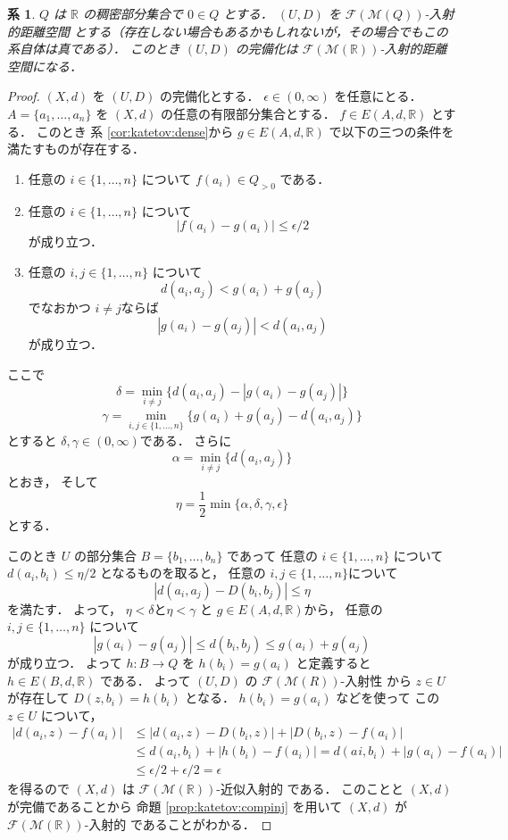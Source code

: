 \documentclass[leqno, 12pt]{jsarticle}
\newtheorem{cor}[thm]{系}
\newcommand{\rr}{\mathbb{R}}
\begin{document}
\begin{cor}\label{cor:katetov:compbecomesUrysohn}
$Q$
は
$\rr$
の稠密部分集合で
$0\in Q$
とする．
$(U, D)$
を
$\mathscr{F}(\mathscr{M}(Q))$-入射的距離空間
とする（存在しない場合もあるかもしれないが，その場合でもこの系自体は真である）．
このとき
$(U, D)$
の完備化は
$\mathscr{F}(\mathscr{M}(\rr))$-入射的距離空間になる．
\end{cor}
\begin{proof}
$(X, d)$
を
$(U, D)$
の完備化とする．
$\epsilon\in (0, \infty)$
を任意にとる．
$A=\{a_{1}, \dots, a_{n}\}$
を
$(X, d)$
の任意の有限部分集合とする．
$f\in E(A, d, \rr)$
とする．
このとき
系
\ref{cor:katetov:dense}から
$g\in E(A, d, \rr)$
で以下の三つの条件を満たすものが存在する．
\begin{enumerate}
\item 
任意の
$i\in \{1, \dots, n\}$
について
$f(a_i)\in Q_{>0}$
である．
\item 
任意の
$i\in \{1, \dots, n\}$
について
\[
|f(a_i)-g(a_i)|\le \epsilon/2
\]
が成り立つ．
\item 
任意の
$i, j\in \{1, \dots, n\}$
について
\[
d(a_{i}, a_{j})<g(a_{i})+g(a_{j})
\]
でなおかつ
$i\neq j$ならば
\[
|g(a_{i})-g(a_{j})|<d(a_{i}, a_{j})
\]
が成り立つ．

\end{enumerate} 


ここで
\[
\delta=\min_{i\neq j}\{d(a_{i}, a_{j})-|g(a_{i})-g(a_{j})|\}
\]
\[
\gamma=\min_{i, j\in \{1, \dots, n\}}\{ 
g(a_{i})+g(a_{j})-d(a_{i}, a_{j})
\}
\]
とすると
$\delta, \gamma\in (0, \infty)$である．
さらに
\[
\alpha=\min_{i\neq j}\{d(a_{i}, a_{j})\}
\]
とおき，
そして
\[
\eta=\frac{1}{2}\min\{\alpha, \delta, \gamma, \epsilon \}
\]
とする．



このとき
$U$
の部分集合
$B=\{b_{1}, \dots, b_{n}\}$
であって
任意の
$i\in \{1, \dots, n\}$
について
$d(a_{i}, b_{i})\le \eta/2$
となるものを取ると，
任意の
$i, j\in \{1, \dots, n\}$について
\[
|d(a_{i}, a_{j})-D(b_{i}, b_{j})|\le \eta
\]
を満たす．
よって，
$\eta< \delta$と$\eta< \gamma$
と
$g\in E(A, d, \rr)$から，
任意の
$i, j\in \{1, \dots, n\}$
について
\[
|g(a_{i})-g(a_{j})|\le d(b_{i}, b_{j})\le g(a_{i})+g(a_{j})
\]
が成り立つ．
よって
$h\colon  B\to Q$
を
$h(b_i)=g(a_i)$
と定義すると
$h\in E(B, d, \rr)$
である．
よって
$(U, D)$
の
$\mathscr{F}(\mathscr{M}(R))$-入射性
から
$z\in U$が存在して
$D(z, b_{i})=h(b_{i})$
となる．
$h(b_{i})=g(a_{i})$
などを使って
この
$z\in U$
について，
\begin{align*}
|d(a_{i}, z)-f(a_{i})|&\le |d(a_{i}, z)-D(b_{i}, z)|+|D(b_{i}, z)-f(a_{i})|\\
&\le d(a_{i}, b_{i})+|h(b_{i})-f(a_{i})|= d(a_{}i, b_{i})+|g(a_{i})-f(a_{i})|\\
&\le \epsilon/2+\epsilon/2=\epsilon
\end{align*}
を得るので
$(X, d)$
は
$\mathscr{F}(\mathscr{M}(\rr))$-近似入射的
である．
このことと
$(X, d)$
が完備であることから
命題 
\ref{prop:katetov:compinj}
を用いて
$(X, d)$
が
$\mathscr{F}(\mathscr{M}(\rr))$-入射的
であることがわかる．
\end{proof} 
\end{document}
